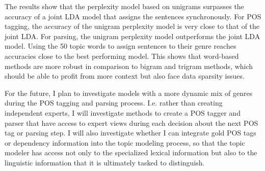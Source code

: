 The results show that the perplexity model  based on unigrams surpasses the accuracy of a joint LDA model that assigns the sentences synchronously.  For POS tagging, the  accuracy of the unigram perplexity model is very close to that of the joint LDA.  For parsing, the unigram perplexity model outperforms the joint LDA model.  Using the 50 topic words to assign sentences to their genre reaches accuracies close to the best performing model. This shows that word-based methods are more robust in comparison to bigram and trigram methods, which should be able to profit from more context but also face data sparsity issues.

For the future, I plan to investigate models with a more dynamic mix of genres during the POS tagging and parsing process. I.e. rather than creating independent experts, I will investigate methods to create a POS tagger and parser that have access to expert views during each decision about the next POS tag or parsing step. I will also investigate whether I can integrate gold POS tags or dependency information into the topic modeling process, so that the topic modeler has access not only to the specialized lexical information but also to the linguistic information that it is ultimately tasked to distinguish. 

